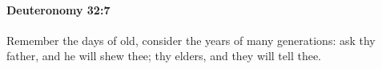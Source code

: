 
		\paragraph{Deuteronomy 32:7} %
			\label{DEUTERONOMY-32-7}

			Remember the days of old, consider the years of many generations: ask thy father, and he will shew thee; thy elders, and they will tell thee.


